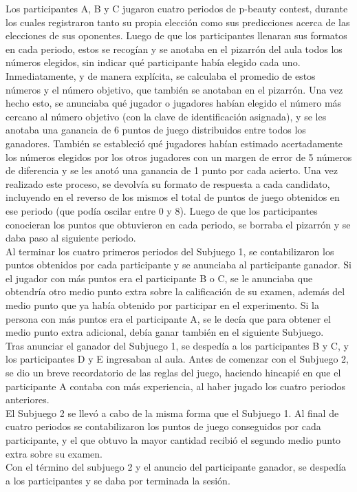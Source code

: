 Los participantes A, B y C jugaron cuatro periodos de p-beauty contest, durante los cuales registraron tanto su propia elección como sus predicciones acerca de las elecciones de sus oponentes. Luego de que los participantes llenaran sus formatos en cada periodo, estos se recogían y se anotaba en el pizarrón del aula todos los números elegidos, sin indicar qué participante había elegido cada uno. Inmediatamente, y de manera explícita, se calculaba el promedio de estos números y el número objetivo, que también se anotaban en el pizarrón. Una vez hecho esto, se anunciaba qué jugador o jugadores habían elegido el número más cercano al número objetivo (con la clave de identificación asignada), y se les anotaba una ganancia de 6 puntos de juego distribuidos entre todos los ganadores. También se estableció qué jugadores habían estimado acertadamente los números elegidos por los otros jugadores con un margen de error de 5 números de diferencia y se les anotó una ganancia de 1 punto por cada acierto. Una vez realizado este proceso, se devolvía su formato de respuesta a cada candidato, incluyendo en el reverso de los mismos el total de puntos de juego obtenidos en ese periodo (que podía oscilar entre 0 y 8). Luego de que los participantes conocieran los puntos que obtuvieron en cada periodo, se borraba el pizarrón y se daba paso al siguiente periodo.\\

Al terminar los cuatro primeros periodos del Subjuego 1, se contabilizaron los puntos obtenidos por cada participante y se anunciaba al participante ganador. Si el jugador con más puntos era el participante B o C, se le anunciaba que obtendría otro medio punto extra sobre la calificación de su examen, además del medio punto que ya había obtenido por participar en el experimento. Si la persona con más puntos era el participante A, se le decía que para obtener el medio punto extra adicional, debía ganar también en el siguiente Subjuego.\\

Tras anunciar el ganador del Subjuego 1, se despedía a los participantes B y C, y los participantes D y E ingresaban al aula. Antes de comenzar con el Subjuego 2, se dio un breve recordatorio de las reglas del juego, haciendo hincapié en que el participante A contaba con más experiencia, al haber jugado los cuatro periodos anteriores.\\

El Subjuego 2 se llevó a cabo de la misma forma que el Subjuego 1. Al final de cuatro periodos se contabilizaron los puntos de juego conseguidos por cada participante, y el que obtuvo la mayor cantidad recibió el segundo medio punto extra sobre su examen.\\

Con el término del subjuego 2 y el anuncio del participante ganador, se despedía a los participantes y se daba por terminada la sesión.\\

